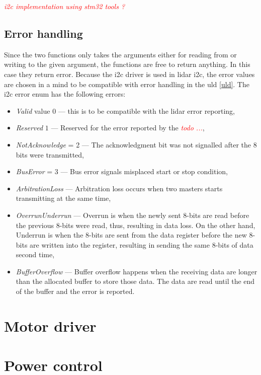 \documentclass[
  digital,     %
  oneside,     %
  nosansbold,  %
  nocolorbold, %
  lof,         %
  lot,         %
]{fithesis4}
\newcommand{\TODO}[1]{\textcolor{red}{\textit{#1}}}
\begin{document}
{{{\TODO{i2c implementation using stm32 tools ?}

\subsection{ Error handling }
Since the two functions only takes the arguments either for reading from or writing to the given argument, the functions are free to return anything. In this case they return error. Because the \acrshort{i2c} driver is used in \acrshort{lidar} \acrshort{i2c}, the error values are chosen in a mind to be compatible with error handling in the \acrshort{uld} \ref{uld}. The \acrshort{i2c} error enum has the following errors:
\begin{itemize}
    \item \emph{Valid} value $0$ --- this is to be compatible with the \acrshort{lidar} error reporting,
    \item \emph{Reserved} $1$ --- Reserved for the error reported by the \TODO{todo ...},
    \item \emph{NotAcknowledge} = 2 --- The acknowledgment bit was not signalled after the 8 bits were transmitted,
    \item \emph{BusError} = 3 --- Bus error signals misplaced start or stop condition,
    \item \emph{ArbitrationLoss} --- Arbitration loss occurs when two masters starts transmitting at the same time,
    \item \emph{OverrunUnderrun} --- Overrun is when the newly sent 8-bits are read before the previous 8-bits were read, thus, resulting in data loss. On the other hand, Underrun is when the 8-bits are sent from the data register before the new 8-bits are written into the register, resulting in sending the same 8-bits of data second time,
    \item \emph{BufferOverflow} --- Buffer overflow happens when the receiving data are longer than the allocated buffer to store those data. The data are read until the end of the buffer and the error is reported.
\end{itemize}

\section{ Motor driver }

\section{ Power control }
}}}
\end{document}
